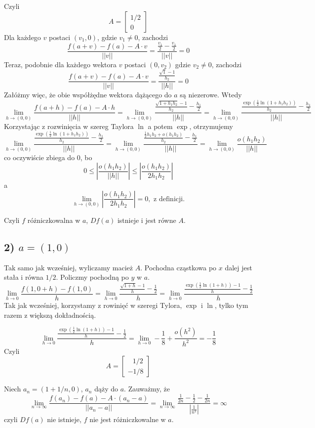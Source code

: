\documentclass{article}
\begin{document}
Czyli
$$ A =
\begin{bmatrix}
1 /2 \\
0
\end{bmatrix}
$$
Dla każdego $v$ postaci $(v_1, 0)$, gdzie $v_1 \neq 0$, zachodzi
$$ \frac{f(a+v)-f(a)- A \cdot v}{||v||} = \frac{\frac{v_1}{2} - \frac{v_1}{2}}{||v||} = 0 $$
Teraz, podobnie dla każdego wektora $v$ postaci $(0, v_2)$ gdzie $v_2 \neq 0$, zachodzi
$$ \frac{f(a+v)-f(a)- A \cdot v}{||v||} = \frac{\frac{\sqrt{1} - 1}{h_2}}{||h||} = 0$$
Załóżmy więc, że obie współżędne wektora dążącego do $a$ są niezerowe. Wtedy
$$ \lim_{h\to (0,0)} \frac{f(a+h) - f(a)-A \cdot h}{||h||} = 
\lim_{h \to (0,0)} \frac{\frac{\sqrt{1+h_1h_2}-1}{h_2} - \frac{h_1}{2}}{||h||} = 
\lim_{h \to (0,0)}\frac{\frac{\exp(\frac{1}{2} \ln(1+h_1h_2))}{h_2} - \frac{h_1}{2}}{||h||} $$
Korzystając z rozwinięcia w szereg Taylora $\ln$ a potem $\exp$, otrzymujemy
$$ \lim_{h \to (0,0)}\frac{\frac{\exp(\frac{1}{2} \ln(1+h_1h_2))}{h_2} - \frac{h_1}{2}}{||h||} =
\lim_{h \to (0,0)}\frac{\frac{\frac{1}{2}h_1h_2 + o(h_1h_2)}{h_2} - \frac{h_1}{2}}{||h||} = 
\lim_{h \to (0,0)} \frac{o(h_1h_2)}{||h||}$$
co oczywiście zbiega do 0, bo 
$$0 \le \left| \frac{o(h_1h_2)}{||h||} \right| \le \left| \frac{o(h_1h_2)}{2h_1h_2} \right| $$
a 
$$ \lim_{h \to (0,0)} \left| \frac{o(h_1h_2)}{2h_1h_2} \right| = 0, \mbox{ z definicji.} $$

Czyli $f$ różniczkowalna w $a$, $Df(a)$ istnieje i jest równe $A$.

\subsection*{2) $a=(1,0)$}
Tak samo jak wcześniej, wyliczamy macież $A$. \newline
Pochodna cząstkowa po $x$ dalej jest stała i równa $1/2$. Policzmy pochodną po $y$ w $a$.
$$\lim_{h \to 0} \frac{f(1,0+h)-f(1,0)}{h} = 
\lim_{h \to 0} \frac{\frac{\sqrt{1+h}-1}{h} - \frac{1}{2}}{h} 
= \lim_{h \to 0}\frac{\frac{\exp(\frac{1}{2}\ln(1+h))-1}{h} - \frac{1}{2}}{h} $$
Tak jak wcześniej, korzystamy z rowinięć w szeregi Tylora, $\exp$ i $\ln$, tylko tym razem z większą dokładnością.

$$ \lim_{h \to 0}\frac{\frac{\exp(\frac{1}{2}\ln(1+h))-1}{h} - \frac{1}{2}}{h} = 
\lim_{h \to 0} -\frac{1}{8} + \frac{o(h^2)}{h^2} = -\frac{1}{8} $$
Czyli 
$$ A =
\begin{bmatrix}
\: \; \: 1 /2 \\
-1 /8
\end{bmatrix}
$$

Niech $a_n=(1+1/n,0)$, $a_n$ dąży do $a$. Zauważmy, że
$$ \lim_{n \to \infty} \frac{f(a_n) - f(a) - A \cdot (a_n-a)}{||a_n-a||} = 
\lim_{n \to \infty} \frac{\frac{1}{2n}-\frac{1}{2}-\frac{1}{2n}}{|\frac{1}{n^2}|} =
\infty
$$
czyli $Df(a)$ nie istnieje, $f$ nie jest różniczkowalne w $a$.
\end{document}
